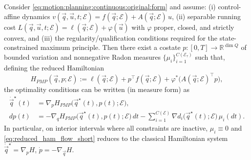 \begin{lemma}
\label{thm:fwd_pmp_to_reduced_ham:short}
Consider \cref{eq:motion:planning:continuous:original:form} and assume:
(i) control-affine dynamics $v(\vec q,\vec u,t;\mathcal E)=f(\vec q;\mathcal E)+A(\vec q;\mathcal E)\,u$,
(ii) separable running cost $L(\vec q,\vec u,t;\mathcal E)=\ell(\vec q;\mathcal E)+\varphi(\vec u)$ with $\varphi$ proper, closed, and strictly convex,
and (iii) the regularity/qualification conditions required for the state-constrained maximum principle.
Then there exist a costate $p:[0,T]\to\mathbb R^{\dim Q}$ of bounded variation and nonnegative Radon measures
$\{\mu_i\}_{i=1}^{C(\mathcal E_\tau)}$ such that, defining the reduced Hamiltonian
\begin{equation}
\label{eq:reduced_ham_short}
H_{PMP}(\vec{q},p;\mathcal E):=\ell(\vec{q};\mathcal E)+p^\top f(\vec{q};\mathcal E)+\varphi^\ast\!\big(A(\vec{q};\mathcal E)^\top p\big),
\end{equation}
the optimality conditions can be written (in measure form) as
\begin{equation}
\label{eq:reduced_ham_flow_short}
\begin{aligned}
\dot{\vec{q}}^{\star}(t)&=\nabla_p H_{PMP}\big(\vec{q}^{\star}(t),p(t);\mathcal E\big),\\
dp(t)&= -\nabla_q H_{PMP}\big(\vec{q}^{\star}(t),p(t);\mathcal E\big)\,dt
-\sum_{i=1}^{C(\mathcal E)} \nabla d_i\!\big(\vec{q}^\star(t);\mathcal E\big)\,\mu_i(dt).    
\end{aligned}
\end{equation}
In particular, on interior intervals where all constraints are inactive, $\mu_i\equiv 0$ and \cref{eq:reduced_ham_flow_short}
reduces to the classical Hamiltonian system $\dot{\vec{q}}^\star=\nabla_p H$, $\dot p=-\nabla_{\vec{q}} H$.
\end{lemma}

